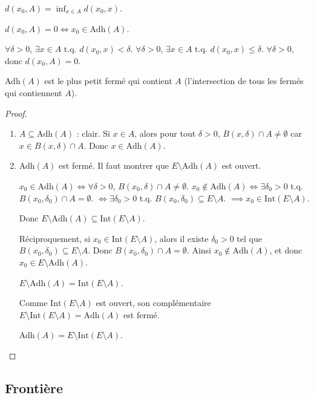 \documentclass[oneside]{book}
\begin{document}
$d(x_0, A) = \inf_{x \in A} d(x_0, x)$.

$d(x_0, A) = 0 \iff x_0 \in \text{Adh}(A)$.

$\forall \delta > 0$, $\exists x \in A$ t.q. $d(x_0, x) < \delta$.
$\forall \delta > 0$, $\exists x \in A$ t.q. $d(x_0, x) \leq \delta$.
$\forall \delta > 0$, donc $d(x_0, A) = 0$.

\begin{proposition}
Adh$(A)$ est le plus petit fermé qui contient $A$ (l'intersection de tous les fermés qui contiennent $A$).
\end{proposition}

\begin{proof}
\begin{enumerate}
    \item $A \subseteq \text{Adh}(A)$ : clair. Si $x \in A$, alors pour tout $\delta > 0$, $B(x, \delta) \cap A \neq \emptyset$ car $x \in B(x, \delta) \cap A$. Donc $x \in \text{Adh}(A)$.
    \item Adh$(A)$ est fermé. Il faut montrer que $E \setminus \text{Adh}(A)$ est ouvert.

    $x_0 \in \text{Adh}(A) \iff \forall \delta > 0$, $B(x_0, \delta) \cap A \neq \emptyset$.
    $x_0 \notin \text{Adh}(A) \iff \exists \delta_0 > 0$ t.q. $B(x_0, \delta_0) \cap A = \emptyset$.
    $\iff \exists \delta_0 > 0$ t.q. $B(x_0, \delta_0) \subseteq E \setminus A$.
    $\implies x_0 \in \text{Int}(E \setminus A)$.

    Donc $E \setminus \text{Adh}(A) \subseteq \text{Int}(E \setminus A)$.

    Réciproquement, si $x_0 \in \text{Int}(E \setminus A)$, alors il existe $\delta_0 > 0$ tel que $B(x_0, \delta_0) \subseteq E \setminus A$. Donc $B(x_0, \delta_0) \cap A = \emptyset$. Ainsi $x_0 \notin \text{Adh}(A)$, et donc $x_0 \in E \setminus \text{Adh}(A)$.

    $E \setminus \text{Adh}(A) = \text{Int}(E \setminus A)$.

    Comme $\text{Int}(E \setminus A)$ est ouvert, son complémentaire $E \setminus \text{Int}(E \setminus A) = \text{Adh}(A)$ est fermé.

    Adh$(A) = E \setminus \text{Int}(E \setminus A)$.
\end{enumerate}
\end{proof}


\subsection{Frontière}
\end{document}
